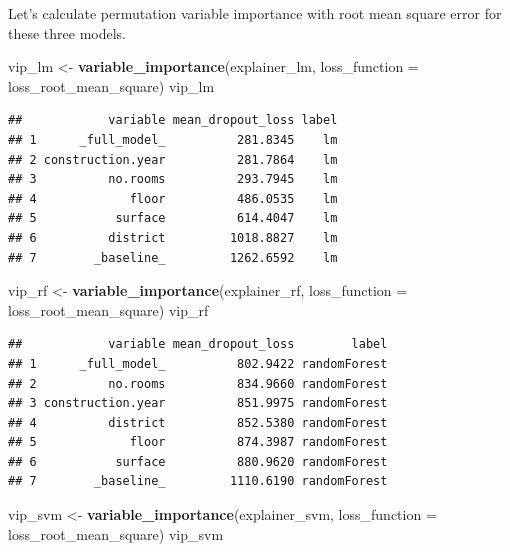 \documentclass[]{krantz}
\newenvironment{Shaded}{\begin{snugshade}}{\end{snugshade}}
\newcommand{\DataTypeTok}[1]{\textcolor[rgb]{0.13,0.29,0.53}{#1}}
\newcommand{\KeywordTok}[1]{\textcolor[rgb]{0.13,0.29,0.53}{\textbf{#1}}}
\newcommand{\NormalTok}[1]{#1}
\newcommand{\StringTok}[1]{\textcolor[rgb]{0.31,0.60,0.02}{#1}}
\begin{document}
Let's calculate permutation variable importance with root mean square error for these three models.

\begin{Shaded}
\begin{Highlighting}[]
\NormalTok{vip_lm <-}\StringTok{ }\KeywordTok{variable_importance}\NormalTok{(explainer_lm, }
            \DataTypeTok{loss_function =}\NormalTok{ loss_root_mean_square)}
\NormalTok{vip_lm}
\end{Highlighting}
\end{Shaded}

\begin{verbatim}
##            variable mean_dropout_loss label
## 1      _full_model_          281.8345    lm
## 2 construction.year          281.7864    lm
## 3          no.rooms          293.7945    lm
## 4             floor          486.0535    lm
## 5           surface          614.4047    lm
## 6          district         1018.8827    lm
## 7        _baseline_         1262.6592    lm
\end{verbatim}

\begin{Shaded}
\begin{Highlighting}[]
\NormalTok{vip_rf <-}\StringTok{ }\KeywordTok{variable_importance}\NormalTok{(explainer_rf, }
            \DataTypeTok{loss_function =}\NormalTok{ loss_root_mean_square)}
\NormalTok{vip_rf}
\end{Highlighting}
\end{Shaded}

\begin{verbatim}
##            variable mean_dropout_loss        label
## 1      _full_model_          802.9422 randomForest
## 2          no.rooms          834.9660 randomForest
## 3 construction.year          851.9975 randomForest
## 4          district          852.5380 randomForest
## 5             floor          874.3987 randomForest
## 6           surface          880.9620 randomForest
## 7        _baseline_         1110.6190 randomForest
\end{verbatim}

\begin{Shaded}
\begin{Highlighting}[]
\NormalTok{vip_svm <-}\StringTok{ }\KeywordTok{variable_importance}\NormalTok{(explainer_svm, }
            \DataTypeTok{loss_function =}\NormalTok{ loss_root_mean_square)}
\NormalTok{vip_svm}
\end{Highlighting}
\end{Shaded}
\end{document}
